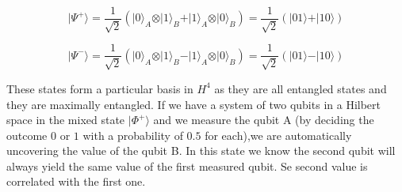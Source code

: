\begin{equation}
\vert\Psi^{+}\rangle=\frac{1}{\sqrt{2}}(\vert0\rangle_{A} \otimes\vert1\rangle_{B} +\vert1\rangle_{A}\otimes\vert0\rangle_{B})=\frac{1}{\sqrt{2}}(\vert01\rangle+\vert10\rangle)
\end{equation}

\begin{equation}
\vert\Psi^{-}\rangle=\frac{1}{\sqrt{2}}(\vert0\rangle_{A} \otimes\vert1\rangle_{B} -\vert1\rangle_{A} \otimes\vert0\rangle_{B})=\frac{1}{\sqrt{2}}(\vert01\rangle-\vert10\rangle)
\end{equation}

These states form a particular basis in $H^4$ as they are all entangled states and they are maximally entangled. If we have a system of two qubits in a Hilbert space in the mixed state $\vert\Phi^{+}\rangle$ and we measure the qubit A (by deciding the outcome $0$ or $1$ with a probability of $0.5$ for each),we are automatically uncovering the value of the qubit B. In this state we know the second qubit will always yield the same value of the first measured qubit. Se second value is correlated with the first one.


